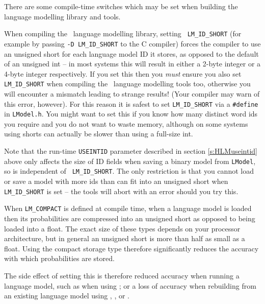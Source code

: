 There are some compile-time switches which may be set when building
the language modelling library and tools.


When compiling the \HTK\ language modelling library, setting {\tt
LM\_ID\_SHORT} (for example by passing {\tt -D LM\_ID\_SHORT} to the C
compiler) forces the compiler to use an unsigned short for each
language model ID it stores, as opposed to the default of an unsigned
int -- in most systems this will result in either a 2-byte integer or
a 4-byte integer respectively.  If you set this then you {\it must}
ensure you also set {\tt LM\_ID\_SHORT} when compiling the \HTK\
language modelling tools too, otherwise you will encounter a mismatch
leading to strange results!  (Your compiler may warn of this error,
however).  For this reason it is safest to set {\tt LM\_ID\_SHORT} via a
{\tt \#define} in {\tt LModel.h}.  You might want to set this if you
know how many distinct word ids you require and you do not want to
waste memory, although on some systems using shorts can actually be
slower than using a full-size int.

Note that the run-time {\tt USEINTID} parameter described in section
\ref{s:HLMuseintid} above only affects the size of ID fields when
saving a binary model from {\tt LModel}, so is independent of {\tt
LM\_ID\_SHORT}.  The only restriction is that you cannot load or save a
model with more ids than can fit into an unsigned short when {\tt
LM\_ID\_SHORT} is set -- the tools will abort with an error should you
try this.



When {\tt LM\_COMPACT} is defined at compile time, when a language model
is loaded then its probabilities are compressed into an unsigned short as opposed
to being loaded into a float.  The exact size of these types
depends on your processor architecture, but in general an unsigned
short is more than half as small as a float.  Using the compact
storage type therefore significantly reduces the accuracy with which
probabilities are stored.

The side effect of setting this is therefore reduced accuracy when
running a language model, such as when using \htool{LPlex}; or a loss
of accuracy when rebuilding from an existing language model using
\htool{LMerge}, \htool{LAdapt}, \htool{LBuild} or \htool{HLMCopy}.



